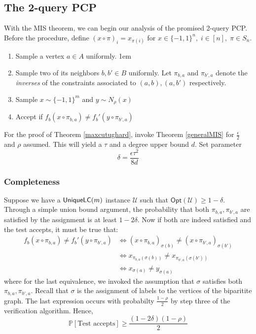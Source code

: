 %
%
%
\subsection{The 2-query PCP}
With the MIS theorem, we can begin our analysis of the promised 2-query PCP. Before the procedure, define $(x \circ \pi)_i = x_{\pi(i)}$ for $x \in \{-1,1\}^n, \; i \in [n], \; \pi \in S_n$.  \newline

\begin{enumerate}
  \item Sample a vertex $a \in A$ uniformly.
  \itemsep1em
  \item Sample two of its neighbors $b,b' \in B$ uniformly. Let $\pi_{b,a}$ and $\pi_{b',a}$ denote the \emph{inverses} of the constraints associated to $(a,b), (a,b')$ respectively.
  \item Sample $x \sim \{-1,1\}^m$ and $y \sim N_\rho(x)$
  \item Accept if $f_b(x \circ \pi_{b,a}) \neq f_b'(y \circ \pi_{b',a})$
\end{enumerate}

For the proof of Theorem \ref{maxcutughard}, invoke Theorem \ref{generalMIS} for $\frac{\epsilon}{2}$ and $\rho$ assumed. This will yield a $\tau$ and a degree upper bound $d$. Set parameter $$ \delta = \frac{\epsilon \tau^2}{8d} $$


\subsubsection{Completeness}
%
Suppose we have a $\mathsf{UniqueLC}(m)$ instance $\mathcal{U}$ such that $\mathsf{Opt}(\mathcal{U}) \geq 1 - \delta$. Through a simple union bound argument, the probability that both $\pi_{b,a},\pi_{b',a}$ are satisfied by the assignment is at least $1- 2\delta$. Now if both are indeed satisfied and the test accepts, it must be true that:
%
\begin{align*}
    f_b(x \circ \pi_{b,a}) \neq f_b'(y \circ \pi_{b',a}) & \iff
    (x \circ \pi_{b,a})_{\sigma(b)} \neq (x \circ \pi_{b',a})_{\sigma(b')} \\
    & \iff x_ {\pi_{b,a}(\sigma(b))} \neq x_ {\pi_{b',a}(\sigma(b'))} \\
    & \iff x_{\sigma(a)} \neq y_{\sigma(a)}
\end{align*}
where for the last equivalence, we invoked the assumption that $\sigma$ satisfies both $\pi_{b,a},\pi_{b',a}$. Recall that $\sigma$ is the assignment of labels to the vertices of the biparitite graph. The last expression occurs with probabilty $\frac{1 - \rho}{2}$ by step three of the verification algorithm. Hence,
\[ \mathbb{P}[\text{Test accepts}] \geq \frac{(1-2\delta)(1 - \rho)}{2}\]

